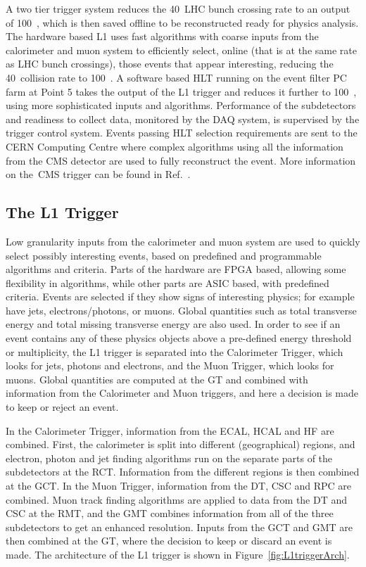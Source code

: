 A two tier trigger system reduces the 40~\MHz \ac{LHC} bunch crossing rate to an output of 100~\Hz, which is then saved offline to be reconstructed ready for physics analysis. 
The hardware based \ac{L1} uses fast algorithms with coarse inputs from the calorimeter and muon system to efficiently select, online (that is at the same rate as \ac{LHC} bunch crossings),
 those events that appear interesting, reducing the 40~\MHz collision rate to 100~\kHz.
A software based \ac{HLT} running on the event filter PC farm at Point 5 takes the output of the \ac{L1} trigger and reduces it further to 100~\Hz, using more sophisticated inputs and algorithms.
Performance of the subdetectors and readiness to collect data, monitored by the \ac{DAQ} system, is supervised by the trigger control system.
Events passing \ac{HLT} selection requirements are sent to the \ac{CERN} Computing Centre where complex algorithms using all the information from the \ac{CMS} detector are used to fully reconstruct the event.
More information on the~\ac{CMS} trigger can be found in Ref.~\cite{Cittolin:578006}.

\subsection{The L1 Trigger}
Low granularity inputs from the calorimeter and muon system are used to quickly select possibly interesting events, based on predefined and programmable algorithms and criteria.
Parts of the hardware are \ac{FPGA} based, allowing some flexibility in algorithms, while other parts are \ac{ASIC} based, with predefined criteria.
Events are selected if they show signs of interesting physics; for example have jets, electrons/photons, or muons. 
Global quantities such as total transverse energy and total missing transverse energy are also used.  
In order to see if an event contains any of these physics objects above a pre-defined energy threshold or multiplicity, 
the L1 trigger is separated into the Calorimeter Trigger, which looks for jets, photons and electrons, and the Muon Trigger, which looks for muons. 
Global quantities are computed at the \ac{GT} and combined with information from the Calorimeter and Muon triggers, 
and here a decision is made to keep or reject an event.

In the Calorimeter Trigger, information from the \ac{ECAL}, \ac{HCAL} and \ac{HF} are combined.
First, the calorimeter is split into different (geographical) regions, and electron, photon and jet finding algorithms run on the separate parts of the subdetectors at the \ac{RCT}.
Information from the different regions is then combined at the \ac{GCT}.%
In the Muon Trigger, information from the \ac{DT}, \ac{CSC} and \ac{RPC} are combined.  
Muon track finding algorithms are applied to data from the \ac{DT} and \ac{CSC} at the \ac{RMT},
and the \ac{GMT} combines information from all of the three subdetectors to get an enhanced resolution.
Inputs from the \ac{GCT} and \ac{GMT} are then combined at the \ac{GT}, 
where the decision to keep or discard an event is made.
The architecture of the L1 trigger is shown in Figure~\ref{fig:L1triggerArch}.

